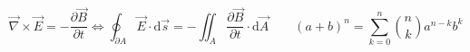 \[\vec{\nabla} \times \vec{E} =
-\dfrac{\partial\vec{B}}{\partial t}
\Longleftrightarrow
\oint_{\partial A} \vec{E} \cdot \mathrm{d}\vec{s} =
-\iint_{A} \dfrac{\partial\vec{B}}{\partial t} \cdot \mathrm{d}\vec{A}
\qquad
(a + b)^n = \sum_{k = 0}^n {n \choose k} a^{n-k} b^k\]
